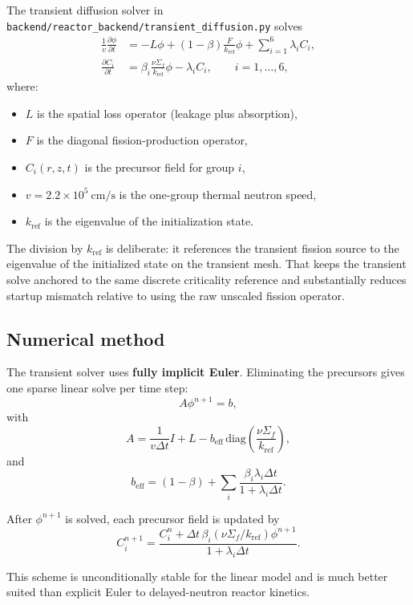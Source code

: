 \documentclass[11pt]{article}
\begin{document}
The transient diffusion solver in
\texttt{backend/reactor\_backend/transient\_diffusion.py} solves
\begin{align}
\frac{1}{v}\frac{\partial \phi}{\partial t}
&=
-L\phi
+ (1-\beta)\frac{F}{k_{\mathrm{ref}}}\phi
+ \sum_{i=1}^{6}\lambda_i C_i,
\\
\frac{\partial C_i}{\partial t}
&=
\beta_i \frac{\nu\Sigma_f}{k_{\mathrm{ref}}}\phi
- \lambda_i C_i,
\qquad i=1,\dots,6,
\end{align}
where:
\begin{itemize}
  \item $L$ is the spatial loss operator (leakage plus absorption),
  \item $F$ is the diagonal fission-production operator,
  \item $C_i(r,z,t)$ is the precursor field for group $i$,
  \item $v = 2.2\times 10^5\ \mathrm{cm/s}$ is the one-group thermal neutron speed,
  \item $k_{\mathrm{ref}}$ is the eigenvalue of the initialization state.
\end{itemize}

The division by $k_{\mathrm{ref}}$ is deliberate: it references the transient
fission source to the eigenvalue of the initialized state on the transient mesh.
That keeps the transient solve anchored to the same discrete criticality
reference and substantially reduces startup mismatch relative to using the raw
unscaled fission operator.

\subsection{Numerical method}

The transient solver uses \textbf{fully implicit Euler}.  Eliminating the
precursors gives one sparse linear solve per time step:
\[
A\phi^{n+1} = b,
\]
with
\[
A = \frac{1}{v\Delta t}I + L
- b_{\mathrm{eff}}\,\mathrm{diag}\!\left(\frac{\nu\Sigma_f}{k_{\mathrm{ref}}}\right),
\]
and
\[
b_{\mathrm{eff}}
=
(1-\beta) + \sum_i \frac{\beta_i \lambda_i \Delta t}{1+\lambda_i \Delta t}.
\]

After $\phi^{n+1}$ is solved, each precursor field is updated by
\[
C_i^{n+1}
=
\frac{C_i^n + \Delta t\,\beta_i(\nu\Sigma_f/k_{\mathrm{ref}})\phi^{n+1}}
{1+\lambda_i \Delta t}.
\]

This scheme is unconditionally stable for the linear model and is much better
suited than explicit Euler to delayed-neutron reactor kinetics.
\end{document}
